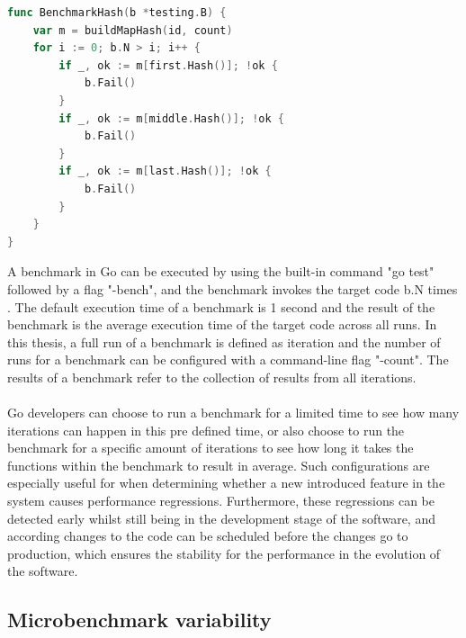 \documentclass{seal_thesis}
\begin{document}
\begin{lstlisting}[caption=An example benchmark from \cite{ironsmile/nedomi}., label={BenchmarkSrc}, language=Go, frame=single, breaklines=false]
func BenchmarkHash(b *testing.B) {
	var m = buildMapHash(id, count)
	for i := 0; b.N > i; i++ {
		if _, ok := m[first.Hash()]; !ok {
			b.Fail()
		}
		if _, ok := m[middle.Hash()]; !ok {
			b.Fail()
		}
		if _, ok := m[last.Hash()]; !ok {
			b.Fail()
		}
	}
}
\end{lstlisting}

\noindent A benchmark in Go can be executed by using the built-in command "go test" followed by a flag "-bench", and the benchmark invokes the target code b.N times \cite{gobench}. The default execution time of a benchmark is 1 second and the result of the benchmark is the average execution time of the target code across all runs. In this thesis, a full run of a benchmark is defined as iteration and the number of runs for a benchmark can be configured with a command-line flag "-count". The results of a benchmark refer to the collection of results from all iterations.\\
\\
Go developers can choose to run a benchmark for a limited time to see how many iterations can happen in this pre defined time, or also choose to run the benchmark for a specific amount of iterations to see how long it takes the functions within the benchmark to result in average. Such configurations are especially useful for when determining whether a new introduced feature in the system causes performance regressions. Furthermore, these regressions can be detected early whilst still being in the development stage of the software, and according changes to the code can be scheduled before the changes go to production, which ensures the stability for the performance in the evolution of the software.


\subsection{Microbenchmark variability}
\label{Microbenchmark variability}
\end{document}
